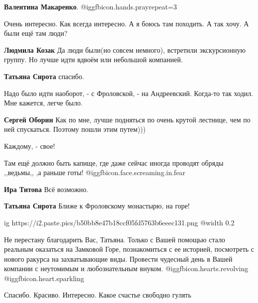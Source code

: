 \begin{itemize}
\textbf{Валентина Макаренко}. @igg{fbicon.hands.pray}{repeat=3} 

Очень интересно.
Как всегда интересно.
А я боюсь там походить.
А так хочу. А были ещё там люди?

\begin{itemize} %
\textbf{Людмила Козак} Да люди были(но совсем немного), встретили экскурсионную группу.
Но лучше идти вдвоём или небольшой компанией.

\textbf{Татьяна Сирота} спасибо.
\end{itemize} %


Надо было идти наоборот, - с Фроловской, - на Андреевский. Когда-то так ходил.
Мне кажется, легче было.

\begin{itemize} %
\textbf{Сергей Оборин} Как по мне, лучше подняться по очень крутой лестнице,
чем по ней спускаться. Поэтому пошли этим путем)))

Каждому, - свое!
\end{itemize} %


Там ещё должно быть капище, где даже сейчас иногда проводят обряды ,,ведьмы,,
,а раньше готы! @igg{fbicon.face.screaming.in.fear} 

\begin{itemize} %
\textbf{Ира Титова} Всё возможно.

\textbf{Татьяна Сирота} Ближе к Фроловскому монастырю, на горе!
\end{itemize} %


\ifcmt
  ig https://i2.paste.pics/b50bb8e47b18ccf05fd5763b6eeec131.png
  @width 0.2
\fi


Не перестану благодарить Вас, Татьяна. Только с Вашей помощью стало реальным
оказаться на Замковой Горе, познакомиться с ее историей, посмотреть с нового
ракурса на захватывающие виды. Провести чудесный день в Вашей компании с
неутомимым и любознательным внуком.  @igg{fbicon.hearts.revolving}  @igg{fbicon.heart.sparkling} 


Спасибо. Красиво. Интересно. Какое счастье свободно гулять


\end{itemize}
